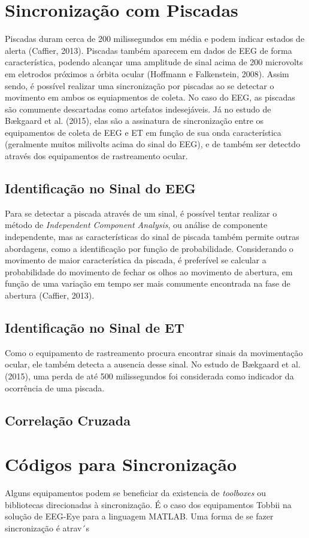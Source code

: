 \section{Sincronização com Piscadas}
Piscadas duram cerca de 200 milissegundos em média e podem indicar estados de alerta (Caffier, 2013). Piscadas também aparecem 
em dados de EEG de forma característica, podendo alcançar uma amplitude de sinal acima de 200 microvolts em eletrodos próximos a órbita ocular (Hoffmann e Falkenstein, 2008). Assim sendo, é possível realizar uma sincronização por piscadas ao se detectar 
o movimento em ambos os equiapmentos de coleta. No caso do EEG, as piscadas são comumente descartadas como artefatos indesejáveis. Já no estudo de 
Bækgaard et al. (2015), elas são a assinatura de sincronização entre os equipamentos de coleta de EEG e ET em função de sua onda característica (geralmente muitos milivolts acima do sinal do EEG), e de também 
ser detectdo através dos equipamentos de rastreamento ocular.

\subsection{Identificação no Sinal do EEG}
Para se detectar a piscada através de um sinal, é possível tentar realizar o método de \textit{Independent Component Analysis}, ou análise de 
componente independente, mas as características do sinal de piscada também permite outras abordagens, como a identificação por função de probabilidade.
Considerando o movimento de maior característica da piscada, é preferível se calcular a probabilidade do movimento de fechar os olhos 
ao movimento de abertura, em função de uma variação em tempo ser mais comumente encontrada na fase de abertura (Caffier, 2013).

\subsection{Identificação no Sinal de ET}
Como o equipamento de rastreamento procura encontrar sinais da movimentação ocular, ele também detecta a ausencia desse sinal. No estudo 
de Bækgaard et al. (2015), uma perda de até 500 milissegundos foi considerada como indicador da ocorrência de uma piscada. 

\subsection{Correlação Cruzada}


\section{Códigos para Sincronização}
Alguns equipamentos podem se beneficiar da existencia de \textit{toolboxes} ou bibliotecas direcionadas à sincronização. É o caso 
dos equipamentos Tobbii na solução de EEG-Eye para a linguagem MATLAB. Uma forma de se fazer sincronização é atrav´s 
